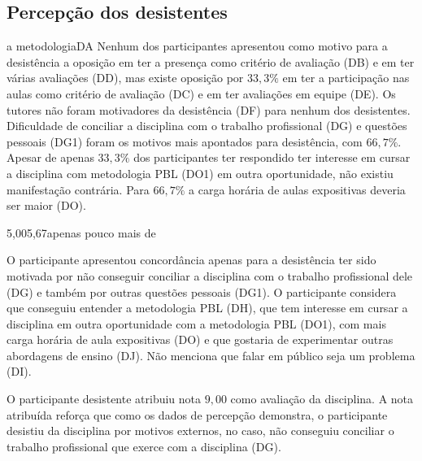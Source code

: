 \subsection{Percepção dos desistentes}
%
{a metodologia}{DA}{}{}
Nenhum dos participantes apresentou como motivo para a desistência a
oposição em ter a presença como critério de avaliação (DB) e
em ter várias avaliações (DD), mas existe oposição por $33,3\%$
em ter a participação nas aulas como critério de avaliação (DC) e em ter
avaliações em equipe (DE).
Os tutores não foram motivadores da desistência (DF) para nenhum
dos desistentes.
Dificuldade de conciliar a disciplina com
o trabalho profissional (DG) e questões pessoais (DG1)
foram os motivos mais apontados para desistência,
com $66,7\%$.
Apesar de apenas $33,3\%$ dos participantes ter respondido ter interesse
em cursar a disciplina com metodologia \ac{PBL} (DO1) em outra oportunidade,
não existiu manifestação contrária.
Para $66,7\%$ a carga horária de aulas expositivas deveria ser maior (DO).

{5,00}{5,67}{apenas pouco mais de}

O participante apresentou concordância apenas para a desistência ter sido motivada
por não conseguir conciliar a disciplina com o trabalho profissional
dele (DG) e também por outras questões pessoais (DG1).
O participante considera que conseguiu entender a metodologia \ac{PBL} (DH),
que tem interesse em cursar a disciplina em outra oportunidade com
a metodologia \ac{PBL} (DO1), com mais carga horária de aula expositivas (DO) e
que gostaria de experimentar outras abordagens de ensino (DJ).
Não menciona que falar em público seja um problema (DI).


O participante desistente atribuiu nota $9,00$ como avaliação da
disciplina.
A nota atribuída reforça que como os dados de percepção demonstra,
o participante desistiu da disciplina por motivos externos, no caso,
não conseguiu conciliar o trabalho profissional que exerce com
a disciplina (DG).
